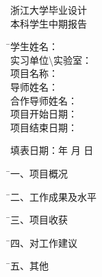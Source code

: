 \newpage
\thispagestyle{empty}

\vspace{4cm}

\begin{center}
\songti\xiaoyi 浙江大学毕业设计  \\
\songti\xiaoyi 本科学生中期报告
\end{center}

\vspace{4cm}

\begin{tabbing}
              \= \songti\sihao 学生姓名：\quad \quad \quad \quad \= \underline{\makebox[8cm]{}} \\[2mm]
               \> \songti\sihao 实习单位\textbackslash 实验室：\> \underline{\makebox[8cm]{\sihao\zjumentorc}} \\[2mm]
               \> \songti\sihao 项目名称：\> \underline{\makebox[8cm]{\sihao\zjugrade\hspace{3mm}\zjumajor}} \\[2mm]
              \> \songti\sihao 导师姓名： \>
              \underline{\makebox[8cm]{}} \\[2mm]
              \> \songti\sihao 合作导师姓名：  \>
              \underline{\makebox[8cm]{}} \\[2mm]
              \> \songti\sihao 项目开始日期： \>
              \underline{\makebox[8cm]{}} \\[2mm]
              \> \songti\sihao 项目结束日期： \>
              \underline{\makebox[8cm]{}}
\end{tabbing}

\vspace{1cm}
\begin{center}
\songti\xiaosan 填表日期：\quad 年 \quad 月 \quad 日
\end{center}
\thispagestyle{empty}
{
\begin{tabbing}
              \= \songti\sihao 一、项目概况
              \\[2mm]
\end{tabbing}
\begin{tabbing}
              \= \songti\sihao 二、工作成果及水平
              \\[2mm]
\end{tabbing}
\begin{tabbing}
              \= \songti\sihao 三、项目收获
              \\[2mm]
\end{tabbing}
\begin{tabbing}
              \= \songti\sihao 四、对工作建议
              \\[2mm]
\end{tabbing}
\begin{tabbing}
              \= \songti\sihao 五、其他
              \\[2mm]
\end{tabbing}
}
